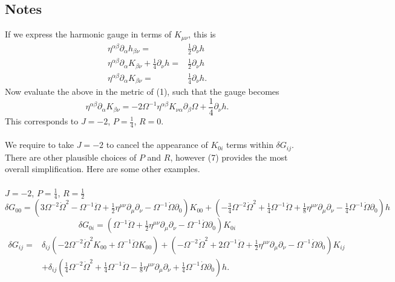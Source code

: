 \documentclass[10pt,letterpaper]{article}
\begin{document}
\subsection*{Notes}
If we express the harmonic gauge in terms of $K_{\mu\nu}$, this is
\begin{align}
\eta^{\alpha\beta} \partial_\alpha h_{\beta\nu} =&{} \frac12 \partial_\nu h\nonumber\\
\eta^{\alpha\beta} \partial_\alpha K_{\beta\nu} + \frac14 \partial_\nu h =&{} \frac12 \partial_\nu h\nonumber\\
\eta^{\alpha\beta} \partial_\alpha K_{\beta\nu} =&{} \frac14 \partial_\nu h.
\end{align}
Now evaluate the above in the metric of (1), such that the gauge becomes
\begin{equation}
	\eta^{\alpha\beta}\partial_{\alpha}K_{\beta\nu} = -2 \Omega^{-1}  \eta^{\alpha\beta}K_{\nu\alpha}\partial_\beta \Omega + \frac14 \partial_\nu h.
\end{equation}
This corresponds to $J=-2$, $P=\tfrac14$, $R=0$. 
\\ \\
We require to take $J=-2$ to cancel the appearance of $K_{0i}$ terms within $\delta G_{ij}$. There are other plausible choices of $P$ and $R$, however (7) provides the most overall simplification. Here are some other examples.\\ \\
$J=-2$, $P=\tfrac14$, $R=\tfrac12$
\begin{equation}
\delta G_{00}=
(3 \Omega^{-2} \dot{\Omega}^2 -  \Omega^{-1} \ddot{\Omega} + \tfrac{1}{2} \eta^{\mu \nu} \partial_{\mu} \partial_{\nu} -  \Omega^{-1} \dot{\Omega} \partial_{0}) K_{00} + (- \tfrac{3}{4} \Omega^{-2} \dot{\Omega}^2 + \tfrac{1}{4} \Omega^{-1} \ddot{\Omega} + \tfrac{1}{8} \eta^{\mu \nu} \partial_{\mu} \partial_{\nu} -  \tfrac{1}{4} \Omega^{-1} \dot{\Omega} \partial_{0}) h
\end{equation}
\begin{equation}
\delta G_{0i}=
(\Omega^{-1} \ddot{\Omega} + \tfrac{1}{2} \eta^{\mu \nu} \partial_{\mu} \partial_{\nu} -  \Omega^{-1} \dot{\Omega} \partial_{0}) K_{0i}
\end{equation}
\begin{align}
\delta G_{ij}={}&\delta_{ij}(-2 \Omega^{-2} \dot{\Omega}^2 K_{00}
 + \Omega^{-1} \ddot{\Omega} K_{00})
 + (- \Omega^{-2} \dot{\Omega}^2
 + 2 \Omega^{-1} \ddot{\Omega}
 + \tfrac{1}{2} \eta^{\mu \nu} \partial_{\mu} \partial_{\nu}
 -  \Omega^{-1} \dot{\Omega} \partial_{0}) K_{ij}\nonumber\\
& +\delta_{ij} (\tfrac{1}{4} \Omega^{-2} \dot{\Omega}^2
 + \tfrac{1}{4} \Omega^{-1} \ddot{\Omega}
 -  \tfrac{1}{8} \eta^{\mu \nu} \partial_{\mu} \partial_{\nu}
 + \tfrac{1}{4} \Omega^{-1} \dot{\Omega} \partial_{0}) h.
\end{align}
\end{document}
